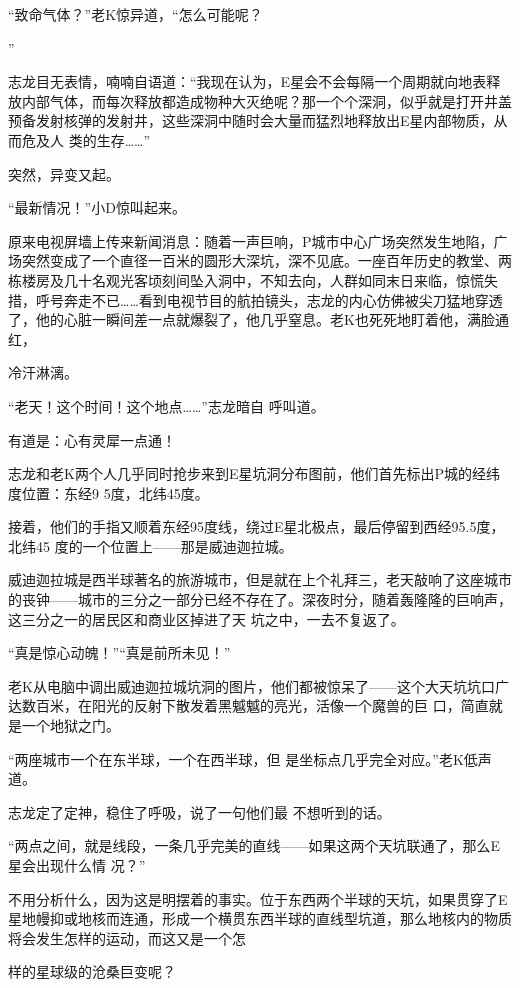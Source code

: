 \documentclass{article}
\begin{document}
“致命气体？”老K惊异道，“怎么可能呢？
\newpage

” 

志龙目无表情，喃喃自语道：“我现在认为，E星会不会每隔一个周期就向地表释放内部气体，而每次释放都造成物种大灭绝呢？那一个个深洞，似乎就是打开井盖预备发射核弹的发射井，这些深洞中随时会大量而猛烈地释放出E星内部物质，从而危及人
类的生存……” 


突然，异变又起。 


“最新情况！”小D惊叫起来。 

原来电视屏墙上传来新闻消息：随着一声巨响，P城市中心广场突然发生地陷，广场突然变成了一个直径一百米的圆形大深坑，深不见底。一座百年历史的教堂、两栋楼房及几十名观光客顷刻间坠入洞中，不知去向，人群如同末日来临，惊慌失措，呼号奔走不已……看到电视节目的航拍镜头，志龙的内心仿佛被尖刀猛地穿透了，他的心脏一瞬间差一点就爆裂了，他几乎窒息。老K也死死地盯着他，满脸通红，
\newpage

冷汗淋漓。 

“老天！这个时间！这个地点……”志龙暗自
呼叫道。 


有道是：心有灵犀一点通！ 

志龙和老K两个人几乎同时抢步来到E星坑洞分布图前，他们首先标出P城的经纬度位置：东经9
5度，北纬45度。 

接着，他们的手指又顺着东经95度线，绕过E星北极点，最后停留到西经95.5度，北纬45
度的一个位置上——那是威迪迦拉城。 

威迪迦拉城是西半球著名的旅游城市，但是就在上个礼拜三，老天敲响了这座城市的丧钟——城市的三分之一部分已经不存在了。深夜时分，随着轰隆隆的巨响声，这三分之一的居民区和商业区掉进了天
坑之中，一去不复返了。 

\newpage


“真是惊心动魄！”“真是前所未见！” 

老K从电脑中调出威迪迦拉城坑洞的图片，他们都被惊呆了——这个大天坑坑口广达数百米，在阳光的反射下散发着黑魆魆的亮光，活像一个魔兽的巨
口，简直就是一个地狱之门。 

“两座城市一个在东半球，一个在西半球，但
是坐标点几乎完全对应。”老K低声道。 

志龙定了定神，稳住了呼吸，说了一句他们最
不想听到的话。 

“两点之间，就是线段，一条几乎完美的直线——如果这两个天坑联通了，那么E星会出现什么情
况？” 

不用分析什么，因为这是明摆着的事实。位于东西两个半球的天坑，如果贯穿了E星地幔抑或地核而连通，形成一个横贯东西半球的直线型坑道，那么地核内的物质将会发生怎样的运动，而这又是一个怎
\newpage

样的星球级的沧桑巨变呢？ 
\end{document}
